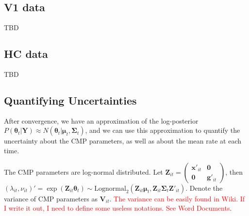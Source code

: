 \documentclass[aoas]{imsart}
\theoremstyle{plain}
\theoremstyle{remark}
\begin{document}
\subsection{V1 data}
TBD

\subsection{HC data}
TBD



\begin{appendix}
\section{Quantifying Uncertainties}\label{appA}

After convergence, we have an approximation of the log-posterior $P(\bm{\theta}_t|\bm{Y}) \approx N(\bm{\theta}_t|\bm{\mu}_t, \bm{\Sigma}_t)$, and we can use this approximation to quantify the uncertainty about the CMP parameters, as well as about the mean rate at each time.

The CMP parameters are log-normal distributed. Let $\bm{Z}_{it} = \begin{pmatrix}
	\bm{x}'_{it} & \bm{0} \\
	\bm{0} & \bm{g}'_{it} 
\end{pmatrix}$, then $(\lambda_{it},\nu_{it})'=\exp(\bm{Z}_{it}\bm{\theta}_t) \sim \text{Lognormal}_2(\bm{Z}_{it}\bm{\mu}_t, \bm{Z}_{it}\bm{\Sigma}_t\bm{Z}'_{it})$. Denote the variance of CMP parameters as $\bm{V}_{it}$. \textcolor{red}{The variance can be easily found in Wiki. If I write it out, I need to define some useless notations. See Word Documents}.


\end{appendix}
\end{document}
